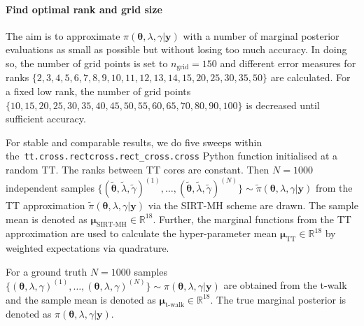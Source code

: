 \paragraph{Find optimal rank and grid size}
The aim is to approximate $\pi( \bm{\theta},\lambda,\gamma  | \bm{y})$ with a number of marginal posterior evaluations as small as possible but without losing too much accuracy.
In doing so, the number of grid points is set to $n_{\text{grid}} = 150$ and different error measures for ranks $\{2,3,4,5,6,7,8,9,10,11,12,13,14,15, 20, 25, 30, 35, 50\}$ are calculated.
For a fixed low rank, the number of grid points \linebreak$\{10, 15, 20, 25, 30, 35, 40, 45, 50, 55, 60, 65, 70, 80, 90, 100\}$ is decreased until sufficient accuracy.

For stable and comparable results, we do five sweeps within \linebreak the~\texttt{tt.cross.rectcross.rect\_cross.cross} Python function initialised at a random TT.
The ranks between TT cores are  constant.
Then $N = 1000$ independent samples  $ \{( \tilde{ \bm{\theta}},  \tilde{\lambda},  \tilde{\gamma })^{(1)} ,\dots, (\tilde{ \bm{\theta}},  \tilde{\lambda},  \tilde{\gamma })^{(N)}   \} \sim \tilde{\pi}( \bm{\theta},\lambda,\gamma  | \bm{y})$ from the TT approximation $\tilde{\pi}( \bm{\theta},\lambda,\gamma  | \bm{y})$ via the SIRT-MH scheme are drawn.
The sample mean is denoted as $\bm{\mu}_{\text{SIRT-MH}}\in \mathbb{R}^{18}$.
Further, the marginal functions from the TT approximation are used to calculate the hyper-parameter mean $\bm{\mu}_{\text{TT}}\in \mathbb{R}^{18}$ by weighted expectations via quadrature.

For a ground truth $N = 1000$ samples $ \{( \bm{\theta},\lambda,\gamma )^{(1)} ,\dots,( \bm{\theta},\lambda,\gamma )^{(N)}   \} \sim \pi( \bm{\theta},\lambda,\gamma  | \bm{y})$
are obtained from the t-walk and the sample mean is denoted as $ \bm{\mu}_{\text{t-walk}}  \in \mathbb{R}^{18}$.
The true marginal posterior is denoted as $ \pi( \bm{\theta},\lambda,\gamma  | \bm{y})$.

